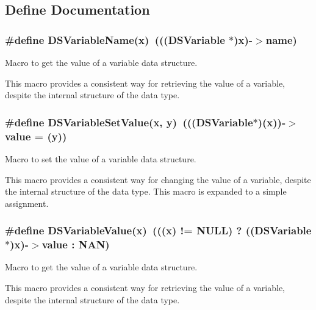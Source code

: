\subsection{Define Documentation}
\hypertarget{group___d_s___v_a_r_i_a_b_l_e___a_c_c_e_s_s_o_r_y_ga64afbf5e8e378ef611c25084211152c4}{
\subsubsection[{DSVariableName}]{\setlength{\rightskip}{0pt plus 5cm}\#define DSVariableName(x)~((({\bf DSVariable} $\ast$)x)-\/$>$name)}}
\label{group___d_s___v_a_r_i_a_b_l_e___a_c_c_e_s_s_o_r_y_ga64afbf5e8e378ef611c25084211152c4}


Macro to get the value of a variable data structure. 

This macro provides a consistent way for retrieving the value of a variable, despite the internal structure of the data type. \hypertarget{group___d_s___v_a_r_i_a_b_l_e___a_c_c_e_s_s_o_r_y_ga218a0d1de0bb5ea62d7e5aa22fe50793}{
\subsubsection[{DSVariableSetValue}]{\setlength{\rightskip}{0pt plus 5cm}\#define DSVariableSetValue(x, \/  y)~((({\bf DSVariable}$\ast$)(x))-\/$>$value = (y))}}
\label{group___d_s___v_a_r_i_a_b_l_e___a_c_c_e_s_s_o_r_y_ga218a0d1de0bb5ea62d7e5aa22fe50793}


Macro to set the value of a variable data structure. 

This macro provides a consistent way for changing the value of a variable, despite the internal structure of the data type. This macro is expanded to a simple assignment. \hypertarget{group___d_s___v_a_r_i_a_b_l_e___a_c_c_e_s_s_o_r_y_ga837d0718b28591df6f518eb50d98082a}{
\subsubsection[{DSVariableValue}]{\setlength{\rightskip}{0pt plus 5cm}\#define DSVariableValue(x)~(((x) != NULL) ? (({\bf DSVariable}$\ast$)x)-\/$>$value : NAN)}}
\label{group___d_s___v_a_r_i_a_b_l_e___a_c_c_e_s_s_o_r_y_ga837d0718b28591df6f518eb50d98082a}


Macro to get the value of a variable data structure. 

This macro provides a consistent way for retrieving the value of a variable, despite the internal structure of the data type. 
